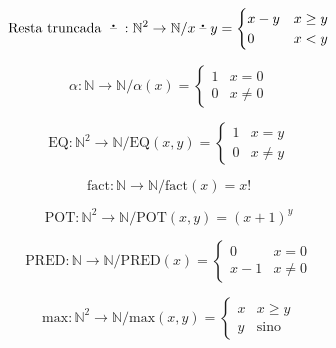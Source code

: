 \begin{equation} \label{eq:anexo-restatruncada}
    \text{Resta truncada } \;\accentset{\mbox{\large\bfseries .}}{\text{--}}\;: \mathbb{N}^2 \to \mathbb{N} / 
    x \;\accentset{\mbox{\large\bfseries .}}{\text{--}}\; y =
    \begin{cases}
        x-y & x \geq y \\
        0 & x < y
    \end{cases}
\end{equation}

\begin{equation} \label{eq:anexo-alpha}
    \alpha: \mathbb{N} \to \mathbb{N} / 
    \alpha (x) =
    \begin{cases}
        1 & x = 0 \\
        0 & x \neq 0
    \end{cases}
\end{equation}

\begin{equation} \label{eq:anexo-eq}
    \mathrm{EQ}: \mathbb{N}^2 \to \mathbb{N} / 
    \mathrm{EQ} (x,y) =
    \begin{cases}
        1 & x = y \\
        0 & x \neq y
    \end{cases}
\end{equation}

\begin{equation} \label{eq:anexo-fact}
    \mathrm{fact}: \mathbb{N} \to \mathbb{N} / 
    \mathrm{fact} (x) = x!
\end{equation}

\begin{equation} \label{eq:anexo-pot}
    \mathrm{POT}: \mathbb{N}^2 \to \mathbb{N} / 
    \mathrm{POT} (x,y) = {(x+1)}^{y}
\end{equation}

\begin{equation} \label{eq:anexo-pred}
    \mathrm{PRED}: \mathbb{N} \to \mathbb{N} / 
    \mathrm{PRED} (x) =
    \begin{cases}
        0 & x = 0 \\
        x-1 & x \neq 0
    \end{cases}
\end{equation}

\begin{equation} \label{eq:anexo-max}
    \mathrm{max}: \mathbb{N}^2 \to \mathbb{N} / 
    \mathrm{max} (x,y) =
    \begin{cases}
        x & x \geq y \\
        y & \text{sino}
    \end{cases}
\end{equation}

